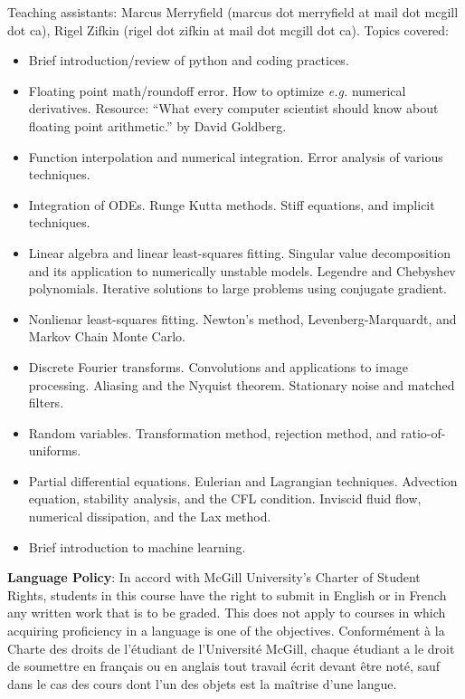 \documentclass[12]{article}
\begin{document}
\noindent
Teaching assistants:  Marcus Merryfield (marcus dot merryfield at
mail dot mcgill dot ca), Rigel Zifkin (rigel dot zifkin at mail dot
mcgill dot ca).
\vskip 0.1in
\noindent Topics covered:
\begin{itemize}
\item Brief introduction/review of python and coding practices.  

\item Floating point math/roundoff error.  How to optimize
  {\textit{e.g.}} numerical derivatives.  Resource: ``What every
  computer scientist should know about floating point arithmetic.'' by
  David Goldberg.  

\item Function interpolation and numerical integration.  Error
  analysis of various techniques. 

\item Integration of ODEs. Runge Kutta methods.  Stiff equations, and
  implicit techniques.

\item Linear algebra and linear least-squares fitting.  Singular value
  decomposition and its application to numerically unstable models.
  Legendre and Chebyshev polynomials.  Iterative solutions to large
  problems using conjugate gradient.

\item Nonlienar least-squares fitting.  Newton's method,
  Levenberg-Marquardt, and Markov Chain Monte Carlo.  

\item Discrete Fourier transforms.  Convolutions and applications to
  image processing.  Aliasing and the Nyquist theorem.  Stationary
  noise and matched filters. 

\item Random variables.  Transformation method, rejection method, and
  ratio-of-uniforms.  

\item Partial differential equations. Eulerian and Lagrangian
  techniques.  Advection equation, stability analysis, and the  CFL
  condition.  Inviscid fluid flow, numerical dissipation, and the Lax
  method.  

\item Brief introduction to machine learning.

\end{itemize}

\vskip 0.1in
\noindent
{\textbf{Language Policy}}:\newline
\noindent
In accord with McGill University’s Charter of Student Rights, students
in this course have the right to submit in English or in French any
written work that is to be graded. This does not apply to courses in
which acquiring proficiency in a language is one of the objectives.
\vskip 0.05in
\noindent
Conformément à la Charte des droits de l’étudiant de l’Université
McGill, chaque étudiant a le droit de soumettre en français ou en
anglais tout travail écrit devant être noté, sauf dans le cas des
cours dont l’un des objets est la maîtrise d’une langue. 
\vskip 0.1in
\end{document}
